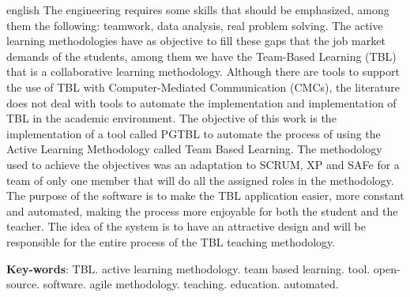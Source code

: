 \begin{resumo}[Abstract]
 \begin{otherlanguage*}{english}
   The engineering requires some skills that should be emphasized, among them the following: teamwork, data analysis,
   real problem solving. The active learning methodologies have as objective to fill these gaps that the job market
   demands of the students, among them we have the Team-Based Learning (TBL) that is a collaborative learning
   methodology. Although there are tools to support the use of TBL with Computer-Mediated Communication (CMCs), the
   literature does not deal with tools to automate the implementation and implementation of TBL in the academic
   environment. The objective of this work is the implementation of a tool called PGTBL to automate the process of using
   the Active Learning Methodology called Team Based Learning. The methodology used to achieve the objectives was an
   adaptation to SCRUM, XP and SAFe for a team of only one member that will do all the assigned roles in the
   methodology. The purpose of the software is to make the TBL application easier, more constant and automated, making
   the process more enjoyable for both the student and the teacher. The idea of the system is to have an
   attractive design and will be responsible for the entire process of the TBL teaching methodology.

   \vspace{\onelineskip}

   \noindent
   \textbf{Key-words}: TBL. active learning methodology. team based learning. tool. open-source. software. agile
   methodology. teaching. education. automated.
 \end{otherlanguage*}
\end{resumo}
